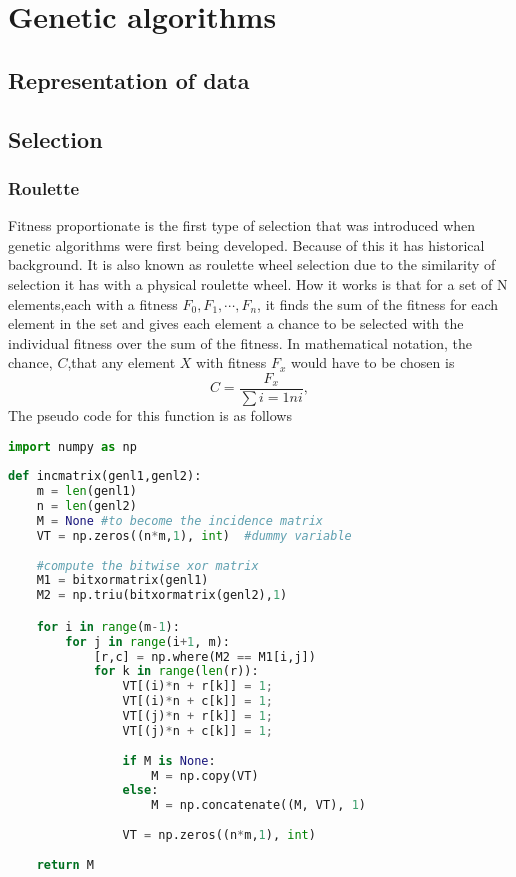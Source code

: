 \section{Genetic algorithms}

\subsection{Representation of data}

\subsection{Selection}

\subsubsection{Roulette}
Fitness proportionate is the first type of selection that was introduced when genetic algorithms
were first being developed.
Because of this it has historical background. It is also known as roulette wheel selection due 
to the similarity of selection it has with a physical roulette wheel. 
How it works is that for a set of N elements,each with a fitness $F_{0}, F_{1}, \cdots, F_{n}$,
it finds the sum of the fitness for each element in the set and gives each element a chance to
be selected with the individual fitness over the sum of the fitness. 
In mathematical notation, the chance, $C$,that any element $X$ with fitness $F_{x}$ would have 
to be chosen is
\begin{equation}
	\label{equ:rulette_prob}
	C = \frac{F_{x}}{\sum{i=1}{n}i},
\end{equation}
The pseudo code for this function is as follows 
\begin{lstlisting}[language=Python]
import numpy as np
    
def incmatrix(genl1,genl2):
    m = len(genl1)
    n = len(genl2)
    M = None #to become the incidence matrix
    VT = np.zeros((n*m,1), int)  #dummy variable
    
    #compute the bitwise xor matrix
    M1 = bitxormatrix(genl1)
    M2 = np.triu(bitxormatrix(genl2),1) 

    for i in range(m-1):
        for j in range(i+1, m):
            [r,c] = np.where(M2 == M1[i,j])
            for k in range(len(r)):
                VT[(i)*n + r[k]] = 1;
                VT[(i)*n + c[k]] = 1;
                VT[(j)*n + r[k]] = 1;
                VT[(j)*n + c[k]] = 1;
                
                if M is None:
                    M = np.copy(VT)
                else:
                    M = np.concatenate((M, VT), 1)
                
                VT = np.zeros((n*m,1), int)
    
    return M
\end{lstlisting}
